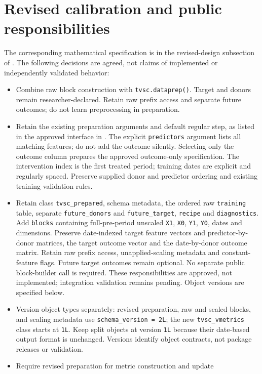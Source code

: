 \documentclass[11pt]{article}
\begin{document}
\section{Revised calibration and public responsibilities}\label{sec:calibration-revision}
The corresponding mathematical specification is in the revised-design
subsection of . The following decisions are
agreed, not claims of implemented or independently validated behavior:
\begin{itemize}
\item Combine raw block construction with \texttt{tvsc.dataprep()}.
Target and donors remain researcher-declared. Retain raw prefix access
and separate future outcomes; do not learn preprocessing in preparation.
\item Retain the existing preparation arguments and default regular step,
as listed in the approved interface in .
The explicit \texttt{predictors} argument lists all matching
features; do not add the outcome silently. Selecting only the outcome
column prepares the approved outcome-only specification. The intervention
index is the first treated period; training dates are explicit and
regularly spaced. Preserve supplied donor and predictor ordering and
existing training validation rules.
\item Retain class \texttt{tvsc\_prepared}, schema metadata, the ordered
raw \texttt{training} table, separate \texttt{future\_donors} and
\texttt{future\_target}, \texttt{recipe} and \texttt{diagnostics}.
Add \texttt{blocks} containing full-pre-period unscaled \texttt{X1},
\texttt{X0}, \texttt{Y1}, \texttt{Y0}, dates and dimensions. Preserve
date-indexed target feature vectors and predictor-by-donor matrices,
the target outcome vector and the date-by-donor outcome matrix. Retain
raw prefix access, unapplied-scaling metadata and constant-feature flags.
Future target outcomes remain optional. No separate public block-builder
call is required. These responsibilities are approved, not implemented;
integration validation remains pending. Object versions are specified below.
\item Version object types separately: revised preparation, raw and scaled
blocks, and scaling metadata use \texttt{schema\_version = 2L}; the new
\texttt{tvsc\_vmetrics} class starts at \texttt{1L}. Keep split objects
at version \texttt{1L} because their date-based output format is unchanged.
Versions identify object contracts, not package releases or validation.
\item Require revised preparation for metric construction and update

\end{itemize}
\end{document}
